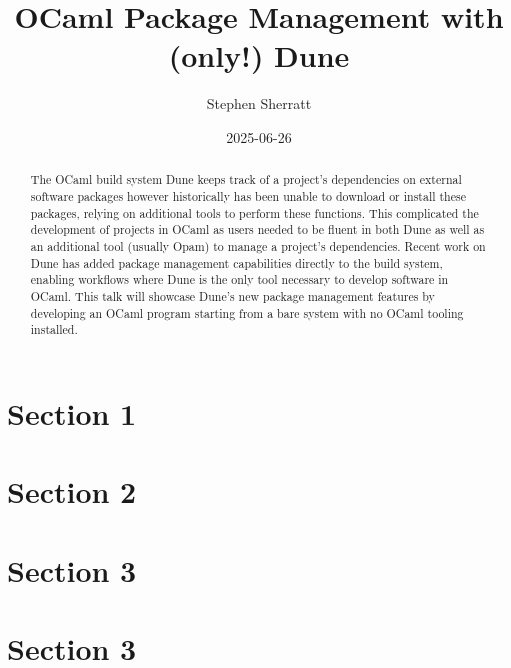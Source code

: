 \documentclass{article}
\title{\bf OCaml Package Management with (only!) Dune}
\date{2025-06-26}
\author[1]{Stephen Sherratt}
\affil[1]{Tarides}
\begin{document}
    \maketitle

    \begin{abstract}
    \noindent
    The OCaml build system Dune keeps track of a project's dependencies on
    external software packages however historically has been unable to download
    or install these packages, relying on additional tools to perform these
    functions. This complicated the development of projects in OCaml as users
    needed to be fluent in both Dune as well as an additional tool (usually
    Opam) to manage a project's dependencies. Recent work on Dune has added
    package management capabilities directly to the build system, enabling
    workflows where Dune is the only tool necessary to develop software in
    OCaml.
    \newline
    \newline
    \noindent
    This talk will showcase Dune's new package management features by
    developing an OCaml program starting from a bare system with no OCaml
    tooling installed.
    \end{abstract}

    \begin{multicols}{2}

        \section{Section 1}

        \lipsum[1]

        \section{Section 2}

        \lipsum[1]

        \section{Section 3}

        \lipsum[1]

        \section{Section 3}

        \lipsum[1]

    \end{multicols}
\end{document}
